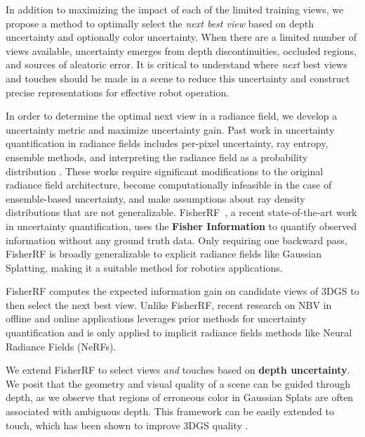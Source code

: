 In addition to maximizing the impact of each of the limited training views, we propose a method to optimally select the \emph{next best view} based on depth uncertainty and optionally color uncertainty. When there are a limited number of views available, uncertainty emerges from depth discontinuities, occluded regions, and sources of aleatoric error. It is critical to understand where \textit{next} best views and touches should be made in a scene to reduce this uncertainty and construct precise representations for effective robot operation. 

In order to determine the optimal next view in a radiance field, we develop a uncertainty metric and maximize uncertainty gain. Past work in uncertainty quantification in radiance fields includes per-pixel uncertainty, ray entropy, ensemble methods, and interpreting the radiance field as a probability distribution  \cite{lin2022active, pan2022activenerf, lee2022uncertainty, shen2024estimating}. These works require significant modifications to the original radiance field architecture, become computationally infeasible in the case of ensemble-based uncertainty, and make assumptions about ray density distributions that are not generalizable. FisherRF~\cite{jiang2023fisherrf}, a recent state-of-the-art work in uncertainty quantification, uses the \textbf{Fisher Information} to quantify observed information without any ground truth data. Only requiring one backward pass, FisherRF is broadly generalizable to explicit radiance fields like Gaussian Splatting, making it a suitable method for robotics applications.


FisherRF computes the expected information gain on candidate views of \gls{3DGS} to then select the next best view. Unlike FisherRF, recent research on NBV in offline and online applications \cite{lee2022uncertainty, shen2024estimating, pan2022activenerf} leverages prior methods for uncertainty quantification and is only applied to implicit radiance fields methods like Neural Radiance Fields (NeRFs). 


We extend FisherRF to select views \textit{and} touches based on \textbf{depth uncertainty}. We posit that the geometry and visual quality of a scene can be guided through depth, as we observe that regions of erroneous color in Gaussian Splats are often associated with ambiguous depth. This framework can be easily extended to touch, which has been shown to improve \gls{3DGS} quality \cite{swann2024touch}. 


